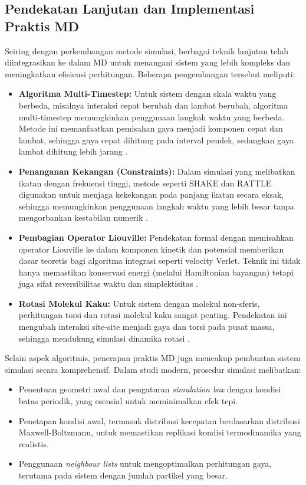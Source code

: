 \subsection{Pendekatan Lanjutan dan Implementasi Praktis MD}
Seiring dengan perkembangan metode simulasi, berbagai teknik lanjutan telah diintegrasikan ke dalam MD untuk menangani sistem yang lebih kompleks dan meningkatkan efisiensi perhitungan.
Beberapa pengembangan tersebut meliputi:
\begin{itemize}
    \item \textbf{Algoritma Multi-Timestep:} Untuk sistem dengan skala waktu yang berbeda, misalnya interaksi cepat berubah dan lambat berubah, algoritma multi-timestep memungkinkan penggunaan langkah waktu yang berbeda.
Metode ini memanfaatkan pemisahan gaya menjadi komponen cepat dan lambat, sehingga gaya cepat dihitung pada interval pendek, sedangkan gaya lambat dihitung lebih jarang \cite{Frenkel2001}.
    \item \textbf{Penanganan Kekangan (Constraints):} Dalam simulasi yang melibatkan ikatan dengan frekuensi tinggi, metode seperti SHAKE dan RATTLE digunakan untuk menjaga kekekangan pada panjang ikatan secara eksak, sehingga memungkinkan penggunaan langkah waktu yang lebih besar tanpa mengorbankan kestabilan numerik \cite{Frenkel2001}.
    \item \textbf{Pembagian Operator Liouville:} Pendekatan formal dengan memisahkan operator Liouville ke dalam komponen kinetik dan potensial memberikan dasar teoretis bagi algoritma integrasi seperti velocity Verlet.
Teknik ini tidak hanya memastikan konservasi energi (melalui Hamiltonian bayangan) tetapi juga sifat reversibilitas waktu dan simplektisitas \cite{Frenkel2001}.
    \item \textbf{Rotasi Molekul Kaku:} Untuk sistem dengan molekul non-sferis, perhitungan torsi dan rotasi molekul kaku sangat penting.
Pendekatan ini mengubah interaksi site-site menjadi gaya dan torsi pada pusat massa, sehingga mendukung simulasi dinamika rotasi \cite{Frenkel2001}.
\end{itemize}
Selain aspek algoritmis, penerapan praktis MD juga mencakup pembuatan sistem simulasi secara komprehensif.
Dalam studi modern, prosedur simulasi melibatkan:
\begin{itemize}
    \item Penentuan geometri awal dan pengaturan \emph{simulation box} dengan kondisi batas periodik, yang esensial untuk meminimalkan efek tepi.
    \item Penetapan kondisi awal, termasuk distribusi kecepatan berdasarkan distribusi Maxwell-Boltzmann, untuk memastikan replikasi kondisi termodinamika yang realistis.
    \item Penggunaan \emph{neighbour lists} untuk mengoptimalkan perhitungan gaya, terutama pada sistem dengan jumlah partikel yang besar.
\end{itemize}
